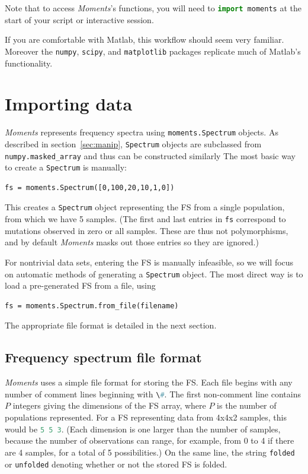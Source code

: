 \documentclass[12pt]{article}
\makeatletter
\newcommand{\py}[1]{\lstinline[language=Python, showstringspaces=False]@#1@}
\makeatother
\begin{document}
Note that to access \textit{Moments}'s functions, you will need to \py{import moments} at the start of your script or interactive session.

If you are comfortable with Matlab, this workflow should seem very familiar.
Moreover the \py{numpy}, \py{scipy}, and \py{matplotlib} packages replicate much of Matlab's functionality.

\section{Importing data}

\textit{Moments} represents frequency spectra using \py{moments.Spectrum} objects.
As described in section~\ref{sec:manip}, \py{Spectrum} objects are subclassed from \py{numpy.masked_array} and thus can be constructed similarly
The most basic way to create a \py{Spectrum} is manually:
\begin{lstlisting}
fs = moments.Spectrum([0,100,20,10,1,0])
\end{lstlisting}
This creates a \py{Spectrum} object representing the FS from a single population, from which we have 5 samples.
(The first and last entries in \py{fs} correspond to mutations observed in zero or all samples. These are thus not polymorphisms, and by default \textit{Moments} masks out those entries so they are ignored.)

For nontrivial data sets, entering the FS is manually infeasible, so we will focus on automatic methods of generating a \py{Spectrum} object.
The most direct way is to load a pre-generated FS from a file, using
\begin{lstlisting}
fs = moments.Spectrum.from_file(filename)
\end{lstlisting}
The appropriate file format is detailed in the next section.

\subsection{Frequency spectrum file format}

\textit{Moments} uses a simple file format for storing the FS.
Each file begins with any number of comment lines beginning with \py{\#}.
The first non-comment line contains $P$ integers giving the dimensions of the FS array, where $P$ is the number of populations represented.
For a FS representing data from 4x4x2 samples, this would be \py{5 5 3}.
(Each dimension is one larger than the number of samples, because the number of observations can range, for example, from 0 to 4 if there are 4 samples, for a total of 5 possibilities.)
On the same line, the string \py{folded} or \py{unfolded} denoting whether or not the stored FS is folded.
\end{document}
